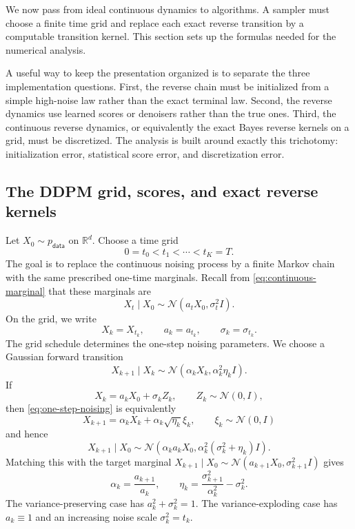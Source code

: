\documentclass{amsart}
\numberwithin{equation}{section}
\theoremstyle{plain}
\theoremstyle{definition}
\theoremstyle{remark}
\newcommand{\R}{\mathbb{R}}
\newcommand{\Id}{I}
\newcommand{\pdata}{p_{\mathsf{data}}}
\newcommand{\normal}[2]{\mathcal{N}\!\left(#1,#2\right)}
\begin{document}
We now pass from ideal continuous dynamics to algorithms.  A sampler must
choose a finite time grid and replace each exact reverse transition by a
computable transition kernel.  This section sets up the formulas needed
for the numerical analysis.

A useful way to keep the presentation organized is to separate the three
implementation questions.  First, the reverse chain must be initialized from a
simple high-noise law rather than the exact terminal law.  Second, the reverse
dynamics use learned scores or denoisers rather than the true ones.  Third, the
continuous reverse dynamics, or equivalently the exact Bayes reverse kernels on
a grid, must be discretized.  The analysis is built around exactly this
trichotomy: initialization error, statistical score error, and discretization
error.

\subsection{The DDPM grid, scores, and exact reverse kernels}
\label{subsec:ddpm-grid}

Let $X_0\sim\pdata$ on $\R^d$.  Choose a time grid
\[
    0=t_0<t_1<\cdots<t_K=T.
\]
The goal is to replace the continuous noising process by a finite Markov chain with the same prescribed one-time
marginals.  Recall from \eqref{eq:continuous-marginal} that these marginals are
\[
    X_t\mid X_0\sim\normal{a_tX_0}{\sigma_t^2\Id}.
\]
On the grid, we write
\[
   X_k = X_{t_k}, \qquad  a_k=a_{t_k}, \qquad \sigma_k=\sigma_{t_k}.
\]
The grid schedule determines the one-step noising parameters.  We choose a
Gaussian forward transition
\begin{equation}\label{eq:one-step-noising}
    X_{k+1}\mid X_k
    \sim
    \normal{\alpha_k X_k}{\alpha_k^2\eta_k\Id}.
\end{equation}
If
\[
    X_k=a_kX_0+\sigma_k Z_k,\qquad Z_k\sim\normal{0}{\Id},
\]
then \eqref{eq:one-step-noising} is equivalently
\[
    X_{k+1}=\alpha_kX_k+\alpha_k\sqrt{\eta_k}\xi_k,
    \qquad \xi_k\sim\normal{0}{\Id}
\]
and hence
\[
    X_{k+1}\mid X_0
    \sim
    \normal{
    \alpha_k a_kX_0
    }{
    \alpha_k^2(\sigma_k^2+\eta_k)\Id
    }.
\]
Matching this with the target marginal
$X_{k+1}\mid X_0\sim\normal{a_{k+1}X_0}{\sigma_{k+1}^2\Id}$ gives
\[
    \alpha_k=\frac{a_{k+1}}{a_k},
    \qquad
    \eta_k=\frac{\sigma_{k+1}^2}{\alpha_k^2}-\sigma_k^2.
\]
The variance-preserving case has $a_k^2+\sigma_k^2=1$.  The
variance-exploding case has $a_k\equiv1$ and an increasing noise scale $\sigma_k^2=t_k$.
\end{document}
